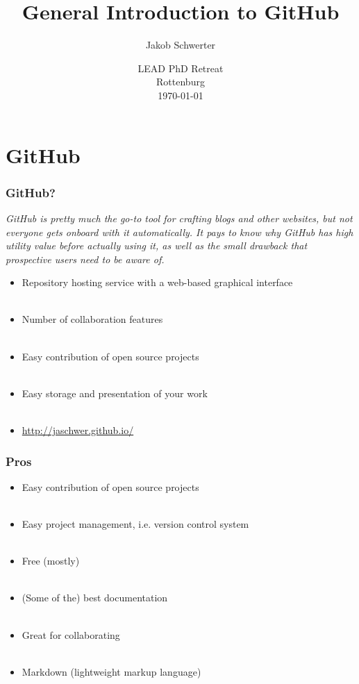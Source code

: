 \documentclass[presentation, 10pt, xcolor=dvipsnames]{beamer}
\title{General Introduction to GitHub}
\author{Jakob Schwerter}
\date{LEAD PhD Retreat\\ Rottenburg \\ \today }
\begin{document}
\begin{frame}
  \titlepage
\end{frame}
%




\section{GitHub}
\begin{frame}[c]
  \frametitle{GitHub?}
\textit{GitHub is pretty much the go-to tool for crafting blogs and other websites, but not everyone gets onboard with it automatically. It pays to know why GitHub has high utility value before actually using it, as well as the small drawback that prospective users need to be aware of.} \\[2ex]
\begin{itemize}
	\item <1-> Repository hosting service with a web-based graphical interface
	\\~\\ \item <2-> Number of collaboration features
	\\~\\ \item <3-> Easy contribution of open source projects
	\\~\\ \item <4-> Easy storage and presentation of your work
	\\~\\ \item <5-> \hyperlink{http://jaschwer.github.io/}{http://jaschwer.github.io/}
	\end{itemize}
\end{frame}


\begin{frame}[c]
  \frametitle{Pros}
\begin{itemize}
	\item <1-> Easy contribution of open source projects
	\\~\\ \item <2-> Easy project management, i.e. version control system
	\\~\\ \item <3-> Free (mostly)
	\\~\\ \item <4-> (Some of the) best documentation
	\\~\\ \item <5-> Great for collaborating
	\\~\\ \item <6-> Markdown (lightweight markup language)
	\end{itemize}
\end{frame}
\end{document}
